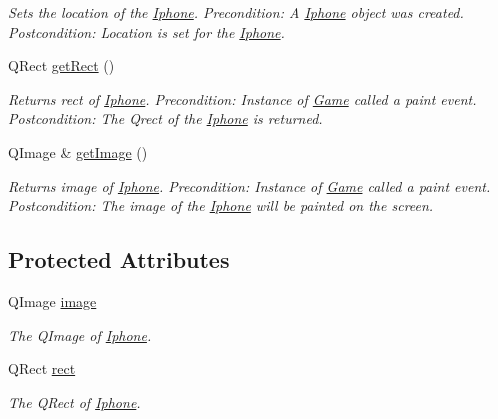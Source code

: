 \begin{DoxyCompactItemize}
\begin{DoxyCompactList}\small\item\em \-Sets the location of the \hyperlink{classIphone}{\-Iphone}. \-Precondition\-: \-A \hyperlink{classIphone}{\-Iphone} object was created. \-Postcondition\-: \-Location is set for the \hyperlink{classIphone}{\-Iphone}. \end{DoxyCompactList}\item 
\-Q\-Rect \hyperlink{classIphone_aec74d7e9c51999592beafba3dc6ccbb1}{get\-Rect} ()
\begin{DoxyCompactList}\small\item\em \-Returns rect of \hyperlink{classIphone}{\-Iphone}. \-Precondition\-: \-Instance of \hyperlink{classGame}{\-Game} called a paint event. \-Postcondition\-: \-The \-Qrect of the \hyperlink{classIphone}{\-Iphone} is returned. \end{DoxyCompactList}\item 
\-Q\-Image \& \hyperlink{classIphone_ae4ded8abf67a640bff96147678239ebb}{get\-Image} ()
\begin{DoxyCompactList}\small\item\em \-Returns image of \hyperlink{classIphone}{\-Iphone}. \-Precondition\-: \-Instance of \hyperlink{classGame}{\-Game} called a paint event. \-Postcondition\-: \-The image of the \hyperlink{classIphone}{\-Iphone} will be painted on the screen. \end{DoxyCompactList}\end{DoxyCompactItemize}
\subsection*{\-Protected \-Attributes}
\begin{DoxyCompactItemize}
\item 
\hypertarget{classIphone_ad3a40dbf0e12d5b92922921350401a93}{\-Q\-Image \hyperlink{classIphone_ad3a40dbf0e12d5b92922921350401a93}{image}}\label{classIphone_ad3a40dbf0e12d5b92922921350401a93}

\begin{DoxyCompactList}\small\item\em \-The \-Q\-Image of \hyperlink{classIphone}{\-Iphone}. \end{DoxyCompactList}\item 
\hypertarget{classIphone_ae9312a0f332393b8387eda54accf70aa}{\-Q\-Rect \hyperlink{classIphone_ae9312a0f332393b8387eda54accf70aa}{rect}}\label{classIphone_ae9312a0f332393b8387eda54accf70aa}

\begin{DoxyCompactList}\small\item\em \-The \-Q\-Rect of \hyperlink{classIphone}{\-Iphone}. \end{DoxyCompactList}\end{DoxyCompactItemize}


